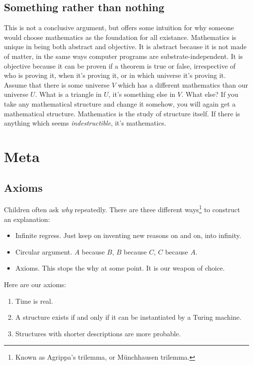 \subsection{Something rather than nothing}

This is not a conclusive argument, but offers some intuition for why someone would choose mathematics as the foundation for all existance.
Mathematics is unique in being both abstract and objective.
It is abstract because it is not made of matter, in the same ways computer programs are substrate-independent. 
It is objective because it can be proven if a theorem is true or false, irrespective of who is proving it, when it's proving it, or in which universe it's proving it.
Assume that there is some universe $V$ which has a different mathematics than our universe $U$.
What is a triangle in $U$, it's something else in $V$.
What else? 
If you take any mathematical structure and change it somehow, you will again get a mathematical structure.
Mathematics is the study of structure itself.
If there is anything which seems \textit{indestructible}, it's mathematics.

\newpage

\section{Meta}

\subsection{Axioms}

Children often ask \textit{why} repeatedly.
There are three different ways\footnote{Known as Agrippa's trilemma, or Münchhausen trilemma.} to construct an explanation:
\begin{itemize}
\setlength\itemsep{0px}
\item Infinite regress. Just keep on inventing new reasons on and on, into infinity.
\item Circular argument. $A$ because $B$, $B$ because $C$, $C$ because $A$.
\item Axioms. This stops the why at some point. It is our weapon of choice.
\end{itemize}

\noindent
Here are our axioms:

\begin{enumerate}
\setlength\itemsep{0px}
\item Time is real.
\item A structure exists if and only if it can be instantiated by a Turing machine.
\item Structures with shorter descriptions are more probable.
\end{enumerate} 

